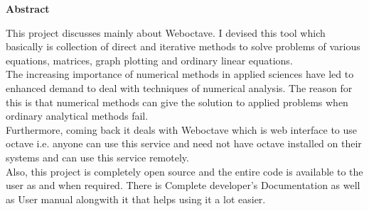 \begin{center}
{\Huge \bf{Abstract}\vskip 0.2in}
\end{center}


This project discusses mainly about Weboctave. I devised this tool which basically is collection of direct and iterative methods to solve problems of various equations, matrices, graph plotting and ordinary linear equations.\\
The increasing importance of numerical methods in applied sciences have led to enhanced demand to deal with techniques of numerical analysis. The reason for this is that numerical methods can give the solution to applied problems when ordinary analytical methods fail.\\
Furthermore, coming back it deals with Weboctave which is web interface to use octave i.e. anyone can use this service and need not have octave installed on their systems and can use this service remotely.\\
Also, this project is completely open source and the entire code is available 
to the user as and when required. There is Complete developer's 
Documentation as well as User manual alongwith it that helps using it a lot easier.


